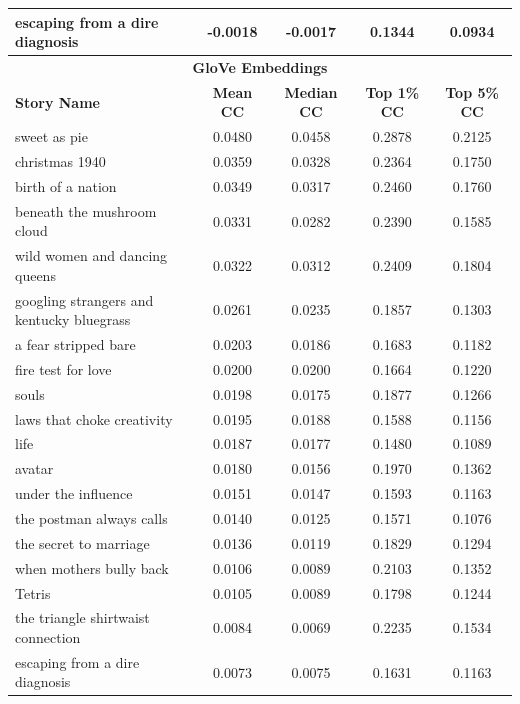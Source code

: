 \documentclass{article}
\begin{document}
\begin{table}[H]
\begin{tabular}{lcccc}
    escaping from a dire diagnosis & -0.0018 & -0.0017 & 0.1344 & 0.0934 \\
    \hline
    \multicolumn{5}{c}{\textbf{GloVe Embeddings}} \\
    \hline
    \textbf{Story Name} & \textbf{Mean CC} & \textbf{Median CC} & \textbf{Top 1\% CC} & \textbf{Top 5\% CC} \\
    \hline
    sweet as pie                & 0.0480 & 0.0458 & 0.2878 & 0.2125 \\
    christmas 1940              & 0.0359 & 0.0328 & 0.2364 & 0.1750 \\
    birth of a nation           & 0.0349 & 0.0317 & 0.2460 & 0.1760 \\
    beneath the mushroom cloud  & 0.0331 & 0.0282 & 0.2390 & 0.1585 \\
    wild women and dancing queens & 0.0322 & 0.0312 & 0.2409 & 0.1804 \\
    googling strangers and kentucky bluegrass & 0.0261 & 0.0235 & 0.1857 & 0.1303 \\
    a fear stripped bare        & 0.0203 & 0.0186 & 0.1683 & 0.1182 \\
    fire test for love          & 0.0200 & 0.0200 & 0.1664 & 0.1220 \\
    souls                       & 0.0198 & 0.0175 & 0.1877 & 0.1266 \\
    laws that choke creativity  & 0.0195 & 0.0188 & 0.1588 & 0.1156 \\
    life                        & 0.0187 & 0.0177 & 0.1480 & 0.1089 \\
    avatar                      & 0.0180 & 0.0156 & 0.1970 & 0.1362 \\
    under the influence         & 0.0151 & 0.0147 & 0.1593 & 0.1163 \\
    the postman always calls    & 0.0140 & 0.0125 & 0.1571 & 0.1076 \\
    the secret to marriage      & 0.0136 & 0.0119 & 0.1829 & 0.1294 \\
    when mothers bully back     & 0.0106 & 0.0089 & 0.2103 & 0.1352 \\
    Tetris                      & 0.0105 & 0.0089 & 0.1798 & 0.1244 \\
    the triangle shirtwaist connection & 0.0084 & 0.0069 & 0.2235 & 0.1534 \\
    escaping from a dire diagnosis & 0.0073 & 0.0075 & 0.1631 & 0.1163 \\
    \hline
  \end{tabular}
\end{table}
\end{document}
